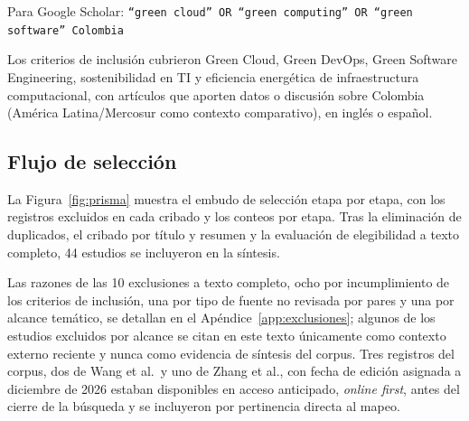 \documentclass[conference]{IEEEtran}
\begin{document}
Para Google Scholar:
\texttt{``green cloud'' OR ``green computing'' OR ``green software'' Colombia}

Los criterios de inclusi\'on cubrieron Green Cloud, Green DevOps, Green Software Engineering, sostenibilidad en TI y eficiencia energ\'etica de infraestructura computacional, con art\'iculos que aporten datos o discusi\'on sobre Colombia (Am\'erica Latina/Mercosur como contexto comparativo), en ingl\'es o español.

\subsection{Flujo de selecci\'on}\label{sec:flujo}
La Figura~\ref{fig:prisma} muestra el embudo de selecci\'on etapa por etapa, con los registros excluidos en cada cribado y los conteos por etapa. Tras la eliminaci\'on de duplicados, el cribado por t\'itulo y resumen y la evaluaci\'on de elegibilidad a texto completo, 44 estudios se incluyeron en la s\'intesis.

Las razones de las 10 exclusiones a texto completo, ocho por incumplimiento de los criterios de inclusi\'on, una por tipo de fuente no revisada por pares y una por alcance tem\'atico, se detallan en el Ap\'endice~\ref{app:exclusiones}; algunos de los estudios excluidos por alcance se citan en este texto \'unicamente como contexto externo reciente y nunca como evidencia de s\'intesis del corpus. Tres registros del corpus, dos de Wang et al.\ y uno de Zhang et al., con fecha de edici\'on asignada a diciembre de 2026 estaban disponibles en acceso anticipado, \emph{online first}, antes del cierre de la b\'usqueda y se incluyeron por pertinencia directa al mapeo.
\end{document}
